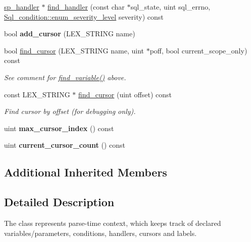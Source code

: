 \begin{DoxyCompactItemize}
\mbox{\hyperlink{classsp__handler}{sp\+\_\+handler}} $\ast$ \mbox{\hyperlink{classsp__pcontext_adbcf9a679c86a5cec3cbb2bcf3caec4a}{find\+\_\+handler}} (const char $\ast$sql\+\_\+state, uint sql\+\_\+errno, \mbox{\hyperlink{classSql__condition_ab0602581e19cddb609bfe10c44be4e83}{Sql\+\_\+condition\+::enum\+\_\+severity\+\_\+level}} severity) const
\item 
\mbox{\label{classsp__pcontext_a5c6665a1f12a14131c9a8e6efec39007}} 
bool {\bfseries add\+\_\+cursor} (L\+E\+X\+\_\+\+S\+T\+R\+I\+NG name)
\item 
\mbox{\label{classsp__pcontext_ad37530a4aa43c8330e7b62ca0fa878d1}} 
bool \mbox{\hyperlink{classsp__pcontext_ad37530a4aa43c8330e7b62ca0fa878d1}{find\+\_\+cursor}} (L\+E\+X\+\_\+\+S\+T\+R\+I\+NG name, uint $\ast$poff, bool current\+\_\+scope\+\_\+only) const
\begin{DoxyCompactList}\small\item\em See comment for \mbox{\hyperlink{classsp__pcontext_aa87f03211c0a7efcbf5df3a40471a599}{find\+\_\+variable()}} above. \end{DoxyCompactList}\item 
\mbox{\label{classsp__pcontext_aeb5cd98d9ebc871444cdac80f9dab23b}} 
const L\+E\+X\+\_\+\+S\+T\+R\+I\+NG $\ast$ \mbox{\hyperlink{classsp__pcontext_aeb5cd98d9ebc871444cdac80f9dab23b}{find\+\_\+cursor}} (uint offset) const
\begin{DoxyCompactList}\small\item\em Find cursor by offset (for debugging only). \end{DoxyCompactList}\item 
\mbox{\label{classsp__pcontext_a6840c5696fc1b817d9393d84611ec14d}} 
uint {\bfseries max\+\_\+cursor\+\_\+index} () const
\item 
\mbox{\label{classsp__pcontext_a9b055b8357d13b4b70c70435dc0c4019}} 
uint {\bfseries current\+\_\+cursor\+\_\+count} () const
\end{DoxyCompactItemize}
\subsection*{Additional Inherited Members}


\subsection{Detailed Description}
The class represents parse-\/time context, which keeps track of declared variables/parameters, conditions, handlers, cursors and labels.

